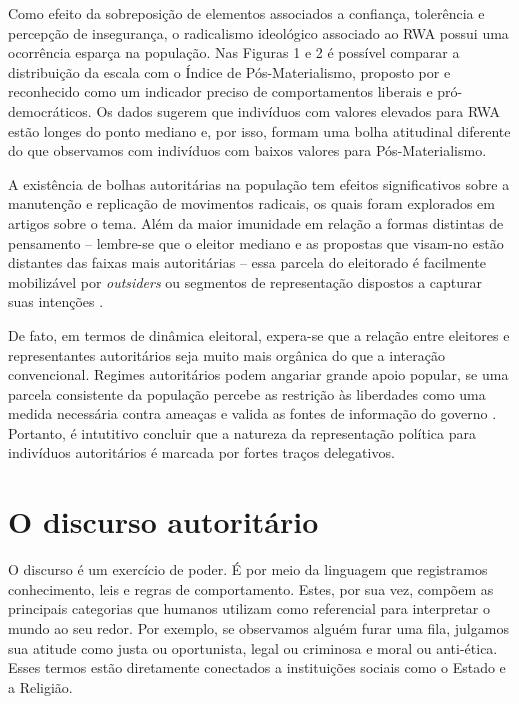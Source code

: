 \documentclass[
12pt,				%
openright,			%
twoside,			%
a4paper,			%
english,			%
french,				%
spanish,			%
brazil				%
]{abntex2}
\begin{document}
Como efeito da sobreposição de elementos associados a confiança, tolerência e percepção de insegurança, o radicalismo ideológico associado ao RWA possui uma ocorrência esparça na população. Nas Figuras 1 e 2 é possível comparar a distribuição da escala com o Índice de Pós-Materialismo, proposto por  e reconhecido como um indicador preciso de comportamentos liberais e pró-democráticos. Os dados sugerem que indivíduos com valores elevados para RWA estão longes do ponto mediano e, por isso, formam uma bolha atitudinal diferente do que observamos com indivíduos com baixos valores para Pós-Materialismo.

A existência de bolhas autoritárias na população tem efeitos significativos sobre a manutenção e replicação de movimentos radicais, os quais foram explorados em artigos sobre o tema. Além da maior imunidade em relação a formas distintas de pensamento -- lembre-se que o eleitor mediano e as propostas que visam-no estão distantes das faixas mais autoritárias -- essa parcela do eleitorado é facilmente mobilizável por \emph{outsiders} ou segmentos de representação dispostos a capturar suas intenções \cite{norris2017western, alexander2017myth}.  

De fato, em termos de dinâmica eleitoral, expera-se que a relação entre eleitores e representantes autoritários seja muito mais orgânica do que a interação convencional. Regimes autoritários podem angariar grande apoio popular, se uma parcela consistente da população percebe as restrição às liberdades como uma medida necessária contra ameaças e valida as fontes de informação do governo \cite{geddes1989sources, stein2013unraveling}. Portanto, é intutitivo concluir que a natureza da representação política para indivíduos autoritários é marcada por fortes traços delegativos.

\section{O discurso autoritário}

O discurso é um exercício de poder. É por meio da linguagem que registramos conhecimento, leis e regras de comportamento. Estes, por sua vez, compõem as principais categorias que humanos utilizam como referencial para interpretar o mundo ao seu redor. Por exemplo, se observamos alguém furar uma fila, julgamos sua atitude como justa ou oportunista, legal ou criminosa e moral ou anti-ética. Esses termos estão diretamente conectados a instituições sociais como o Estado e a Religião. 
\end{document}
